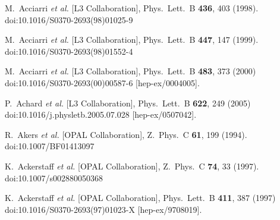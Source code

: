 \documentclass[a4paper,11pt,notoc]{article}
\begin{document}
\begin{thebibliography}{1}
	M.~Acciarri {\it et al.} [L3 Collaboration],
	Phys.\ Lett.\ B {\bf 436}, 403 (1998).
	doi:10.1016/S0370-2693(98)01025-9
	
	
	M.~Acciarri {\it et al.} [L3 Collaboration],
	Phys.\ Lett.\ B {\bf 447}, 147 (1999).
	doi:10.1016/S0370-2693(98)01552-4
	
	
	M.~Acciarri {\it et al.} [L3 Collaboration],
	Phys.\ Lett.\ B {\bf 483}, 373 (2000)
	doi:10.1016/S0370-2693(00)00587-6
	[hep-ex/0004005].
	
	
	
	P.~Achard {\it et al.} [L3 Collaboration],
	Phys.\ Lett.\ B {\bf 622}, 249 (2005)
	doi:10.1016/j.physletb.2005.07.028
	[hep-ex/0507042].
	
	
	R.~Akers {\it et al.} [OPAL Collaboration],
	Z.\ Phys.\ C {\bf 61}, 199 (1994).
	doi:10.1007/BF01413097
	
	
	K.~Ackerstaff {\it et al.} [OPAL Collaboration],
	Z.\ Phys.\ C {\bf 74}, 33 (1997).
	doi:10.1007/s002880050368
	
	
	K.~Ackerstaff {\it et al.} [OPAL Collaboration],
	Phys.\ Lett.\ B {\bf 411}, 387 (1997)
	doi:10.1016/S0370-2693(97)01023-X
	[hep-ex/9708019].
	

\end{thebibliography}
\end{document}
